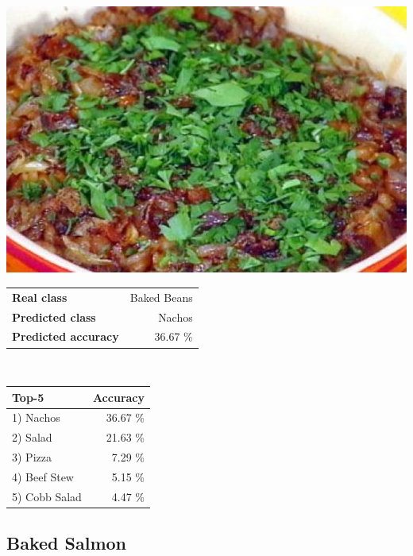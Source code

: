 \begin{minipage}[t]{0.4\textwidth}
	\vspace{0pt}
	\includegraphics[width=\linewidth]{images/evaluation-images/baked_beans/baked-beans89.jpeg}
\end{minipage}
\hfill
\begin{minipage}[t]{0.5\textwidth}
	\vspace{0pt}\raggedright
	\begin{tabularx}{\textwidth}{X r}
		\small \textbf{Real class} & \small Baked Beans\\
		\small \textbf{Predicted class} & \small Nachos\\
		\small \textbf{Predicted accuracy} & \small 36.67 \%
    \end{tabularx}\\
    
    \vspace{6pt}
	\begin{tabularx}{\textwidth}{X r}
        \small \textbf{Top-5} & \small \textbf{Accuracy} \\
        \hline
		\small 1) Nachos & \small 36.67 \%\\\small 2) Salad & \small 21.63 \%\\\small 3) Pizza & \small 7.29 \%\\\small 4) Beef Stew & \small 5.15 \%\\\small 5) Cobb Salad & \small 4.47 \%
    \end{tabularx}
\end{minipage}
    
\subsection{Baked Salmon}
    
